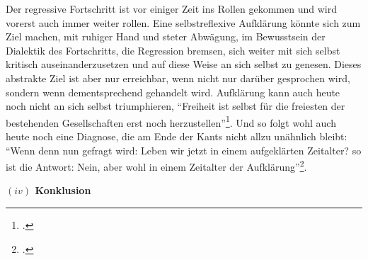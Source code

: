 \documentclass[a4paper, 12pt]{article}
\begin{document}
\begin{onehalfspace}
Der regressive Fortschritt ist vor einiger Zeit ins Rollen gekommen und wird vorerst auch immer weiter rollen. Eine selbstreflexive Aufklärung könnte sich zum Ziel machen, mit ruhiger Hand und steter Abwägung, im Bewusstsein der Dialektik des Fortschritts, die Regression bremsen, sich weiter mit sich selbst kritisch auseinanderzusetzen und auf diese Weise an sich selbst zu genesen. Dieses abstrakte Ziel ist aber nur erreichbar, wenn nicht nur darüber gesprochen wird, sondern wenn dementsprechend gehandelt wird. Aufklärung kann auch heute noch nicht an sich selbst triumphieren, "`Freiheit ist selbst für die freiesten der bestehenden Gesellschaften erst noch herzustellen"'\footnote{\Cite[Siehe][S. 98]{marcuse}.}. Und so folgt wohl auch heute noch eine Diagnose, die am Ende der Kants nicht allzu unähnlich bleibt: "`Wenn denn nun gefragt wird: Leben wir jetzt in einem aufgeklärten Zeitalter? so ist die Antwort: Nein, aber wohl in einem Zeitalter der Aufklärung"'\footnote{\Cite[Siehe][S. 491]{kant}.}.

\vspace{5mm}
%
%
%
\noindent\textbf{$(iv)$ Konklusion}


\end{onehalfspace}
\end{document}
